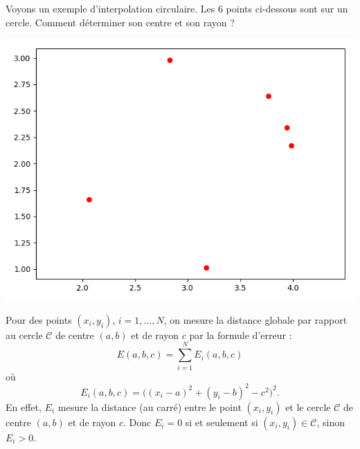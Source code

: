 \documentclass[10pt,class=report,crop=false]{standalone}
\begin{document}
\begin{exemple}
Voyons un exemple d'interpolation circulaire.
Les $6$ points ci-dessous sont sur un cercle. Comment déterminer son centre et son rayon ?
\begin{center}
\includegraphics[scale=\myscale,scale=0.5]{figures/circulaire-01}
\end{center}

Pour des points $(x_i,y_i)$, $i=1,\ldots, N$, on mesure la distance globale par rapport au cercle $\mathcal{C}$ de centre $(a,b)$ et de rayon $c$ par la formule d'erreur :
$$E(a,b,c) = \sum_{i=1}^N E_i(a,b,c)$$
où 
$$E_i(a,b,c) = \big( (x_i-a)^2 + (y_i-b)^2 - c^2 \big)^2.$$
En effet, $E_i$ mesure la distance (au carré) entre le point $(x_i,y_i)$ et le cercle $\mathcal{C}$ de centre $(a,b)$ et de rayon $c$. Donc $E_i=0$ si et seulement si $(x_i,y_i) \in \mathcal{C}$, sinon $E_i > 0$.



\end{exemple}
\end{document}
